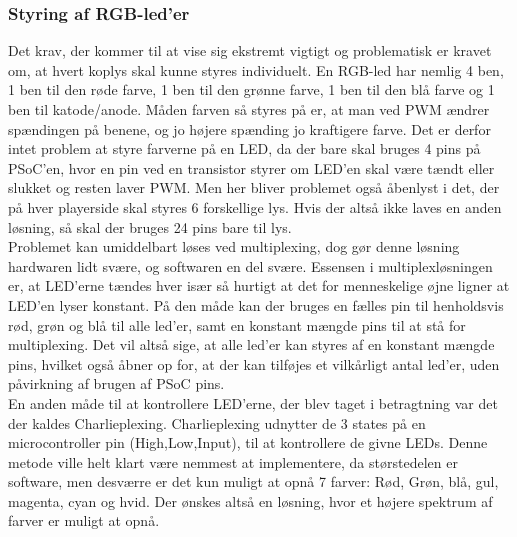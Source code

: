 \documentclass[Softwaredesign/Softwaredesign_main.tex]{subfiles}
\begin{document}
\subsubsection{Styring af RGB-led'er}
Det krav, der kommer til at vise sig ekstremt vigtigt og problematisk er kravet om, at hvert koplys skal kunne styres individuelt. En RGB-led har nemlig 4 ben, 1 ben til den røde farve, 1 ben til den grønne farve, 1 ben til den blå farve og 1 ben til katode/anode. Måden farven så styres på er, at man ved PWM ændrer spændingen på benene, og jo højere spænding jo kraftigere farve. Det er derfor intet problem at styre farverne på en LED, da der bare skal bruges 4 pins på PSoC'en, hvor en pin ved en transistor styrer om LED'en skal være tændt eller slukket og resten laver PWM. Men her bliver problemet også åbenlyst i det, der på hver playerside skal styres 6 forskellige lys. Hvis der altså ikke laves en anden løsning, så skal der bruges 24 pins bare til lys. 
\\Problemet kan umiddelbart løses ved multiplexing, dog gør denne løsning hardwaren lidt svære, og softwaren en del svære. Essensen i multiplexløsningen er, at LED'erne tændes hver især så hurtigt at det for menneskelige øjne ligner at LED'en lyser konstant. På den måde kan der bruges en fælles pin til henholdsvis rød, grøn og blå til alle led'er, samt en konstant mængde pins til at stå for multiplexing. Det vil altså sige, at alle led'er kan styres af en konstant mængde pins, hvilket også åbner op for, at der kan tilføjes et vilkårligt antal led'er, uden påvirkning af brugen af PSoC pins.
\\En anden måde til at kontrollere LED'erne, der blev taget i betragtning var det der kaldes Charlieplexing. Charlieplexing udnytter de 3 states på en microcontroller pin (High,Low,Input), til at kontrollere de givne LEDs. Denne metode ville helt klart være nemmest at implementere, da størstedelen er software, men desværre er det kun muligt at opnå 7 farver: Rød, Grøn, blå, gul, magenta, cyan og hvid. Der ønskes altså en løsning, hvor et højere spektrum af farver er muligt at opnå.
\end{document}
